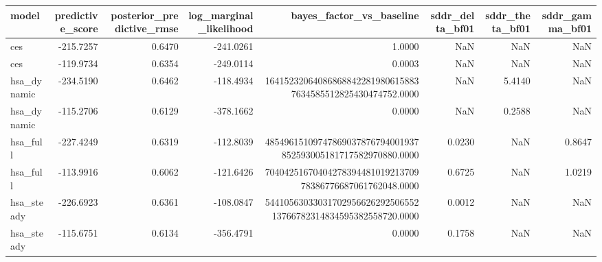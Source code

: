 \begin{tabular}{lrrrrrrr}
\toprule
model & predictive\_score & posterior\_predictive\_rmse & log\_marginal\_likelihood & bayes\_factor\_vs\_baseline & sddr\_delta\_bf01 & sddr\_theta\_bf01 & sddr\_gamma\_bf01 \\
\midrule
ces & -215.7257 & 0.6470 & -241.0261 & 1.0000 & NaN & NaN & NaN \\
ces & -119.9734 & 0.6354 & -249.0114 & 0.0003 & NaN & NaN & NaN \\
hsa\_dynamic & -234.5190 & 0.6462 & -118.4934 & 164152320640868688422819806158837634585512825430474752.0000 & NaN & 5.4140 & NaN \\
hsa\_dynamic & -115.2706 & 0.6129 & -378.1662 & 0.0000 & NaN & 0.2588 & NaN \\
hsa\_full & -227.4249 & 0.6319 & -112.8039 & 48549615109747869037876794001937852593005181717582970880.0000 & 0.0230 & NaN & 0.8647 \\
hsa\_full & -113.9916 & 0.6062 & -121.6426 & 7040425167040427839448101921370978386776687061762048.0000 & 0.6725 & NaN & 1.0219 \\
hsa\_steady & -226.6923 & 0.6361 & -108.0847 & 5441056303303170295662629250655213766782314834595382558720.0000 & 0.0012 & NaN & NaN \\
hsa\_steady & -115.6751 & 0.6134 & -356.4791 & 0.0000 & 0.1758 & NaN & NaN \\
\bottomrule
\end{tabular}
